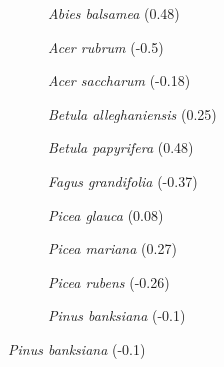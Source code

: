 \begin{figure}[htb]
    \centering
	\begin{subfigure}{0.3\textwidth}
		\centering
		
		\caption{\textit{Abies balsamea} (0.48)}
		\label{fig::abibal_az}
	\end{subfigure}
	\hfil
	\begin{subfigure}{0.3\textwidth}
		\centering
		
		\caption{\textit{Acer rubrum} (-0.5)}
		\label{fig::acerub_az}
	\end{subfigure}
	\hfil
	\begin{subfigure}{0.3\textwidth}
		\centering
		
		\caption{\textit{Acer saccharum} (-0.18)}
		\label{fig::acesac_az}
	\end{subfigure}
	\medskip
	\begin{subfigure}{0.3\textwidth}
		\centering
		
		\caption{\textit{Betula alleghaniensis} (0.25)}
		\label{fig::betall_az}
	\end{subfigure}
	\hfil
	\begin{subfigure}{0.3\textwidth}
		\centering
		
		\caption{\textit{Betula papyrifera} (0.48)}
		\label{fig::betpap_az}
	\end{subfigure}
	\hfil
	\begin{subfigure}{0.3\textwidth}
		\centering
		
		\caption{\textit{Fagus grandifolia} (-0.37)}
		\label{fig::faggran_az}
	\end{subfigure}
	\medskip
	\begin{subfigure}{0.3\textwidth}
		\centering
		
		\caption{\textit{Picea glauca} (0.08)}
		\label{fig::picgla_az}
	\end{subfigure}
	\hfil
	\begin{subfigure}{0.3\textwidth}
		\centering
		
		\caption{\textit{Picea mariana} (0.27)}
		\label{fig::picmar_az}
	\end{subfigure}
	\hfil
	\begin{subfigure}{0.3\textwidth}
		\centering
		
		\caption{\textit{Picea rubens} (-0.26)}
		\label{fig::picrub_az}
	\end{subfigure}
	\medskip
	\begin{subfigure}{0.3\textwidth}
		\centering
		
		\caption{\textit{Pinus banksiana} (-0.1)}

\end{subfigure}
\end{figure}
